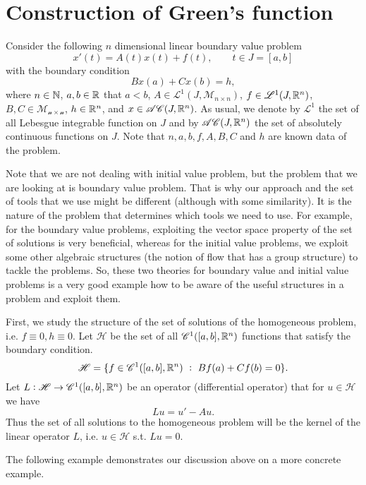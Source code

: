 \section{Construction of Green's function}
Consider the following $n$ dimensional linear boundary value problem
\[ x'(t) = A(t) x(t) + f(t), \qquad t \in J = [a,b] \tag{2.1} \]
with the boundary condition
\[ Bx(a) + Cx(b) = h, \]
where $n \in \mathbb{N}$, $a,b \in \mathbb{R}$ that $a<b$, $A \in \mathscr{L}^1(J,\mathscr{M}_{n\times n})$, $f \in \mathscr{L}^1(J,\mathbb{R}^n)$, $B,C \in \mathscr{M_{n\times n}}$, $h \in \mathbb{R}^n$, and $x \in \mathscr{AC}(J,\mathbb{R}^n)$. As usual, we denote by  $\mathscr{L}^1$ the set of all Lebesgue integrable function on $J$ and by $\mathscr{AC}(J,\mathbb{R}^n)$ the set of absolutely continuous functions on $J$. Note that $n,a,b,f,A,B,C$ and $h$ are known data of the problem.


\begin{beCareful}
	Note that we are not dealing with initial value problem, but the problem that we are looking at is boundary value problem. That is why our approach and the set of tools that we use might be different (although with some similarity). It is the nature of the problem that determines which tools we need to use. For example, for the boundary value problems, exploiting the vector space property of the set of solutions is very beneficial, whereas for the initial value problems, we exploit some other algebraic structures (the notion of flow that has a group structure) to tackle the problems. So, these two theories for boundary value and initial value problems is a very good example how to be aware of the useful structures in a problem and exploit them.
\end{beCareful}

First, we study the structure of the set of solutions of the homogeneous problem, i.e. $f\equiv 0, h\equiv 0$. Let $\mathscr{H}$ be the set of all $\mathscr{C}^1([a,b],\mathbb{R}^n)$ functions that satisfy the boundary condition. 
\[  \mathscr{H} = \{f \in \mathscr{C}^1([a,b],\mathbb{R}^n)\ :\ Bf(a) + Cf(b) = 0\}.  \]
Let $L:\mathscr{H} \to \mathscr{C}^1([a,b],\mathbb{R}^n)$ be an operator (differential operator) that for $u \in \mathscr{H}$ we have
\[ Lu = u' - Au. \]
Thus the set of all solutions to the homogeneous problem will be the kernel of the linear operator $L$, i.e. $u\in \mathscr{H}$ s.t. $Lu = 0$.

The following example demonstrates our discussion above on a more concrete example.

